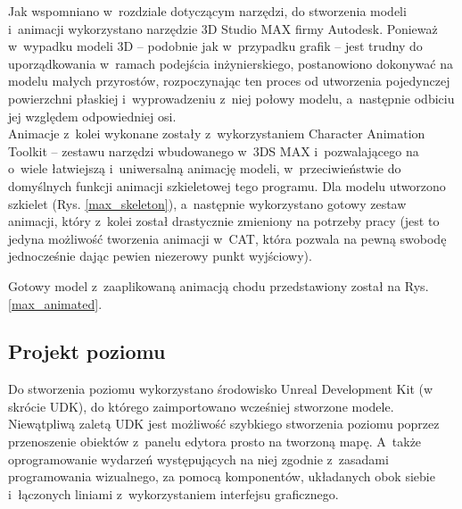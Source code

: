 Jak wspomniano w~rozdziale dotyczącym narzędzi, do stworzenia modeli i~animacji wykorzystano narzędzie 3D Studio MAX firmy Autodesk. Ponieważ w~wypadku modeli 3D -- podobnie jak w~przypadku grafik -- jest trudny do uporządkowania w~ramach podejścia inżynierskiego, postanowiono dokonywać na modelu małych przyrostów, rozpoczynając ten proces od utworzenia pojedynczej powierzchni płaskiej i~wyprowadzeniu z~niej połowy modelu, a~następnie odbiciu jej względem odpowiedniej osi.\\
Animacje z~kolei wykonane zostały z~wykorzystaniem Character Animation Toolkit -- zestawu narzędzi wbudowanego w~3DS MAX i~pozwalającego na o~wiele łatwiejszą i~uniwersalną animację modeli, w~przeciwieństwie do domyślnych funkcji animacji szkieletowej tego programu. Dla modelu utworzono szkielet (Rys. \ref{max_skeleton}), a~następnie wykorzystano gotowy zestaw animacji, który z~kolei został drastycznie zmieniony na potrzeby pracy (jest to jedyna możliwość tworzenia animacji w~CAT, która pozwala na pewną swobodę jednocześnie dając pewien niezerowy punkt wyjściowy).

Gotowy model z~zaaplikowaną animacją chodu przedstawiony został na Rys. \ref{max_animated}.

\subsection{Projekt poziomu}

Do stworzenia poziomu wykorzystano środowisko Unreal Development Kit (w skrócie UDK), do którego zaimportowano wcześniej stworzone modele. Niewątpliwą zaletą UDK jest możliwość szybkiego stworzenia poziomu poprzez przenoszenie obiektów z~panelu edytora prosto na tworzoną mapę. A~także oprogramowanie wydarzeń występujących na niej zgodnie z~zasadami programowania wizualnego, za pomocą komponentów, układanych obok siebie i~łączonych liniami z~wykorzystaniem interfejsu graficznego.

